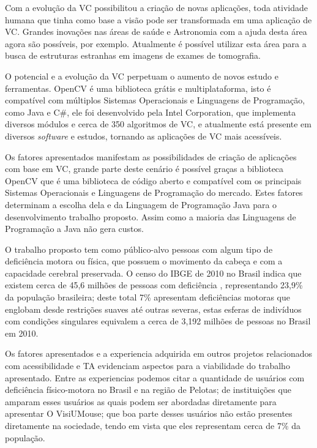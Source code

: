 Com a evolução da VC possibilitou a criação de novas aplicações, toda atividade humana que tinha como base a visão pode ser transformada em uma aplicação de VC. Grandes inovações nas áreas de saúde e Astronomia com a ajuda desta área agora são possíveis, por exemplo. Atualmente é possível utilizar esta área para a busca de estruturas estranhas em imagens de exames de tomografia. 
    
O potencial e a evolução da VC perpetuam o aumento de novos estudo e ferramentas. OpenCV é uma biblioteca grátis e multiplataforma, isto é compatível com múltiplos Sistemas Operacionais e Linguagens de Programação, como Java e C\#, ele foi desenvolvido pela Intel Corporation, que implementa diversos módulos e cerca de 350 algoritmos de VC, e atualmente está presente em diversos \textit{software} e estudos, tornando as aplicações de VC mais acessíveis.  

Os fatores apresentados manifestam as possibilidades de criação de aplicações com base em VC, grande parte deste cenário é possível graças a biblioteca OpenCV que é uma biblioteca de código aberto e compatível com os principais Sistemas Operacionais e Linguagens de Programação do mercado. Estes fatores determinam a escolha dela e da Linguagem de Programação Java para o desenvolvimento trabalho proposto. Assim como a maioria das Linguagens de Programação a Java não gera custos.

O trabalho proposto tem como público-alvo pessoas com algum tipo de deficiência motora ou física, que possuem o movimento da cabeça e com a capacidade cerebral preservada. O  censo do IBGE de 2010 no Brasil indica que existem cerca de 45,6 milhões de pessoas com deficiência , representando 23,9\% da população brasileira; deste total 7\% apresentam deficiências motoras que englobam desde restrições suaves até outras severas, estas esferas de indivíduos com condições singulares equivalem a cerca de 3,192 milhões de pessoas no Brasil em 2010.

Os fatores apresentados e a experiencia adquirida em outros projetos relacionados com acessibilidade e TA evidenciam aspectos para a viabilidade do trabalho apresentado. Entre as experiencias podemos citar a quantidade de usuários com deficiência físico-motora no Brasil e na região de Pelotas; de instituições que amparam esses usuários as quais podem ser abordadas diretamente para apresentar O VisiUMouse; que boa parte desses usuários não estão presentes diretamente na sociedade, tendo em vista que eles representam cerca de 7\% da população.

